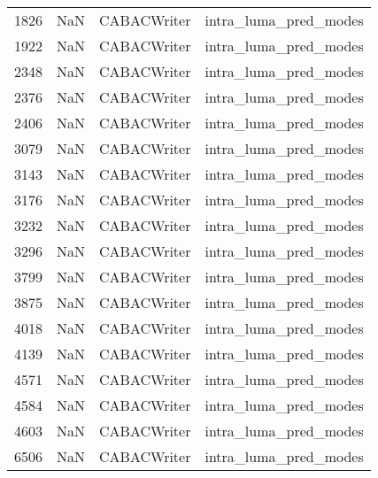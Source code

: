 \begin{tabular}{llll}
1826 &                   NaN &                CABACWriter &                     intra\_luma\_pred\_modes \\
1922 &                   NaN &                CABACWriter &                     intra\_luma\_pred\_modes \\
2348 &                   NaN &                CABACWriter &                     intra\_luma\_pred\_modes \\
2376 &                   NaN &                CABACWriter &                     intra\_luma\_pred\_modes \\
2406 &                   NaN &                CABACWriter &                     intra\_luma\_pred\_modes \\
3079 &                   NaN &                CABACWriter &                     intra\_luma\_pred\_modes \\
3143 &                   NaN &                CABACWriter &                     intra\_luma\_pred\_modes \\
3176 &                   NaN &                CABACWriter &                     intra\_luma\_pred\_modes \\
3232 &                   NaN &                CABACWriter &                     intra\_luma\_pred\_modes \\
3296 &                   NaN &                CABACWriter &                     intra\_luma\_pred\_modes \\
3799 &                   NaN &                CABACWriter &                     intra\_luma\_pred\_modes \\
3875 &                   NaN &                CABACWriter &                     intra\_luma\_pred\_modes \\
4018 &                   NaN &                CABACWriter &                     intra\_luma\_pred\_modes \\
4139 &                   NaN &                CABACWriter &                     intra\_luma\_pred\_modes \\
4571 &                   NaN &                CABACWriter &                     intra\_luma\_pred\_modes \\
4584 &                   NaN &                CABACWriter &                     intra\_luma\_pred\_modes \\
4603 &                   NaN &                CABACWriter &                     intra\_luma\_pred\_modes \\
6506 &                   NaN &                CABACWriter &                     intra\_luma\_pred\_modes \\

\end{tabular}
